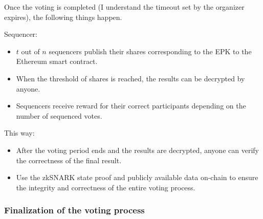 Once the voting is completed (I understand the timeout set by the organizer expires), the following things happen.

Sequencer:

\begin{itemize}
	\item $t$ out of $n$ sequencers publish their shares corresponding to the EPK to the Ethereum smart contract.
	\item When the threshold of shares is reached, the results can be decrypted by anyone.
	\item Sequencers receive reward for their correct participants depending on the number of sequenced votes.
\end{itemize}

This way:

\begin{itemize}
	\item After the voting period ends and the results are decrypted, anyone can verify the correctness of the final result.
	\item Use the zkSNARK state proof and publicly available data on-chain to ensure the integrity and correctness of the entire voting process.
\end{itemize}

\subsubsection{Finalization of the voting process}
\label{sec:vocdoni-protocol:finalization}
